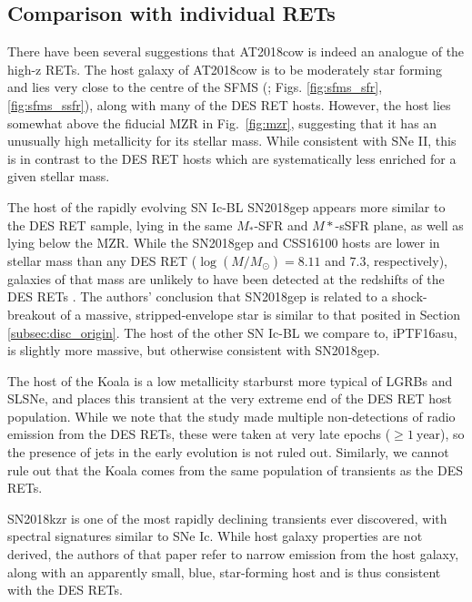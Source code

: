 \documentclass[fleqn,usenatbib,]{mnras}
\newcommand{\replyref}[1]{\color{magenta}#1 \color{black}}
\begin{document}
\subsection{Comparison with individual RETs \label{subsec:disc_lowz}}

 There have been several suggestions that AT2018cow is indeed an analogue of the high-z RETs. The host galaxy of AT2018cow is to be moderately star forming and lies very close to the centre of the SFMS (\citealt{Lyman2020}; Figs. \ref{fig:sfms_sfr},\ref{fig:sfms_ssfr}), along with many of the DES RET hosts. However, the host lies somewhat above the fiducial MZR in Fig.~\ref{fig:mzr}, suggesting that it has an unusually high metallicity for its stellar mass. While consistent with SNe II, this is in contrast to the DES RET hosts which are systematically less enriched for a given stellar mass. 

The host of \replyref{the rapidly evolving SN Ic-BL} SN2018gep appears more similar to the DES RET sample, lying in the same $M_*$-SFR and $M*$-sSFR plane, as well as lying below the MZR. While the SN2018gep \replyref{and CSS16100 hosts are} lower in stellar mass than any DES RET ($\log \left(M/M_{\odot}\right) =8.11$ \replyref{and $7.3$, respectively),} galaxies of that mass are unlikely to have been detected at the redshifts of the DES RETs \citep{Wiseman2020}. The authors' conclusion that SN2018gep is related to a shock-breakout of a massive, stripped-envelope star is similar to that posited in Section \ref{subsec:disc_origin}. \replyref{The host of the other SN Ic-BL we compare to, iPTF16asu, is slightly more massive, but otherwise consistent with SN2018gep.}

The host of the Koala is a low metallicity starburst more typical of LGRBs and SLSNe, and places this transient at the very extreme end of the DES RET host population. While we note that the \citet{Ho2020} study made multiple non-detections of radio emission from the DES RETs, these were taken at very late epochs ($\geq 1~\mathrm{year}$), so the presence of jets in the early evolution is not ruled out. Similarly, we cannot rule out that the Koala comes from the same population of transients as the DES RETs.  

SN2018kzr \citep{McBrien2019,Gillanders2020} is one of the most rapidly declining transients ever discovered, with spectral signatures similar to SNe Ic. While host galaxy properties are not derived, the authors of that paper refer to narrow emission from the host galaxy, along with an apparently small, blue, star-forming host and is thus consistent with the DES RETs.
\end{document}
